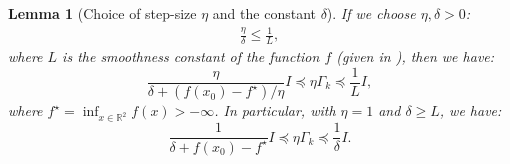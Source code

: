 \documentclass[10pt,a4paper]{amsart}
\newtheorem{lemma}{Lemma}
\newcommand*{\RR}{\mathbb{R}}
\begin{document}
\begin{lemma}[Choice of step-size $\eta$ and the constant $\delta$]
    \label{lemma:step-size-choice}
    If we choose $\eta, \delta > 0$:
    \begin{equation*}
        \begin{aligned}
            \frac{\eta}{\delta} \leq \frac{1}{L},    
        \end{aligned} 
    \end{equation*}
    where $L$ is the smoothness constant of the function $f$ (given in ), then we have:
    \begin{equation*}
        \frac{\eta}{\delta + (f(x_0) - f^\star) / \eta} I\preceq \eta \Gamma_k \preceq \frac{1}{L}I,
    \end{equation*}
    where $f^\star = \inf_{x \in \RR^2} f(x) > -\infty$. In particular, with $\eta = 1$ and $\delta \geq L$, we have:
    \begin{equation*}
        \frac{1}{\delta + f(x_0) - f^\star} I \preceq \eta \Gamma_k \preceq \frac{1}{\delta} I.
    \end{equation*}
\end{lemma}
\end{document}
